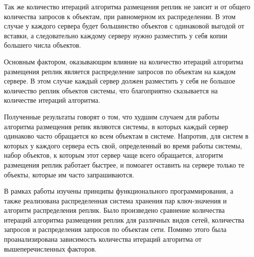 		Так же количество итераций алгоритма размещения реплик не заисит и от общего количества запросов к объектам, при равномерном их распределении. В этом случае у каждого сервера будет 
		большинство объектов с одинаковой выгодой от вставки, а следовательно каждому серверу нужно разместить у себя копии большего числа объектов.

		Основным фактором, оказывающим влияние на количество итераций алгоритма размещения реплик является распределение запросов по объектам на каждом сервере. В этом случае каждый сервер 
		должен разместить у себя не большое количество реплик объектов системы, что благоприятно сказывается на количестве итераций алгоритма.

		Полученные результаты говорят о том, что худшим случаем для работы алгоритма размещения репик являются системы, в которых каждый сервер одинаково часто обращается ко всем объектам в
		системе. Напротив, для систем в которых у каждого сервера есть свой, определенный во время работы системы, набор объектов, к которым этот сервер чаще всего обращается, алгоритм размещения
		реплик работает быстрее, и помоагет оставить на сервере только те объекты, которые им часто запрашиваются. 
\newpage		
		
\Conc

	В рамках работы изучены принципы функционального программирования, а также реализована распределенная система хранения пар ключ-значения и алгоритм распределения реплик.
	Было произведено сравнение количества итераций алгоритма размещения реплик для различных видов сетей, количества запросов и распределения запросов по объектам сети.
	Помимо этого была проанализирована зависимость количества итераций алгоритма от вышеперечисленных факторов.
\newpage

\printbibliography[%
    heading=bibintoc%
]


